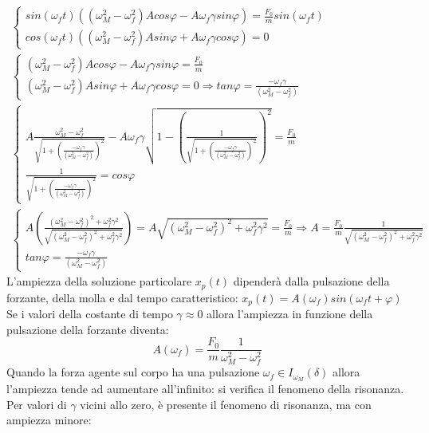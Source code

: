 \documentclass{article}
\numberwithin{equation}{subsection}
\begin{document}
\begin{gather}
    \begin{cases}
        sin(\omega_f t)((\omega_M^{2}-\omega_f^{2})Acos\varphi-A\omega_f\gamma sin\varphi)=\displaystyle\frac{F_0}{m}sin(\omega_f t)\\
        cos(\omega_f t)((\omega_M^{2}-\omega_f^{2})Asin\varphi+A\omega_f\gamma cos\varphi)=0
    \end{cases}\\
    \begin{cases}
        (\omega_M^{2}-\omega_f^{2})Acos\varphi-A\omega_f\gamma sin\varphi=\displaystyle\frac{F_0}{m}\\
        (\omega_M^{2}-\omega_f^{2})Asin\varphi+A\omega_f\gamma cos\varphi=0\Rightarrow\displaystyle tan\varphi=\frac{-\omega_f\gamma}{(\omega_M^{2}-\omega_f^{2})}
    \end{cases}\\
    \begin{cases}
        \displaystyle A\frac{\omega_M^{2}-\omega_f^{2}}{\sqrt{1+\left(\frac{-\omega_f\gamma}{(\omega_M^{2}-\omega_f^{2})}\right)^{2}}}-A\omega_f\gamma\sqrt{1-\left(\displaystyle\frac{1}{\sqrt{1+\left(\frac{-\omega_f\gamma}{(\omega_M^{2}-\omega_f^{2})}\right)^{2}}}\right)^{2}}=\frac{F_0}{m}\\
        \displaystyle\frac{1}{\sqrt{1+\left(\frac{-\omega_f\gamma}{(\omega_M^{2}-\omega_f^{2})}\right)^{2}}}=cos\varphi
    \end{cases}\\
    \begin{cases}
        A\left(\displaystyle\frac{(\omega_M^{2}-\omega_f^{2})^{2}+\omega_f^{2}\gamma^{2}}{\sqrt{(\omega_M^{2}-\omega_f^{2})^{2}+\omega_f^{2}\gamma^{2}}}\right)=A\sqrt{(\omega_M^{2}-\omega_f^{2})^{2}+\omega_f^{2}\gamma^{2}}=\displaystyle\frac{F_0}{m}\Rightarrow A=\frac{F_0}{m}\frac{1}{\sqrt{(\omega_M^{2}-\omega_f^{2})^{2}+\omega_f^{2}\gamma^{2}}}\\
        tan\varphi=\displaystyle\frac{-\omega_f\gamma}{(\omega_M^{2}-\omega_f^{2})}
    \end{cases}
\end{gather}
L'ampiezza della soluzione particolare $x_p(t)$ dipenderà 
dalla pulsazione della forzante, della molla e dal tempo 
caratteristico: $x_p(t)=A(\omega_f)sin(\omega_f t+\varphi)$ \\
Se i valori della costante di tempo $\gamma\approx0$ allora 
l'ampiezza in funzione della pulsazione della forzante diventa:
\begin{equation}
    A(\omega_f)=\displaystyle\frac{F_0}{m}\frac{1}{\omega_M^{2}-\omega_f^{2}}
\end{equation}
Quando la forza agente sul corpo ha una pulsazione 
$\omega_f\in I_{\omega_M}(\delta)$ allora l'ampiezza tende 
ad aumentare all'infinito: si verifica il fenomeno della 
risonanza. Per valori di $\gamma$ vicini allo zero, è presente 
il fenomeno di risonanza, ma con ampiezza minore:
\end{document}
